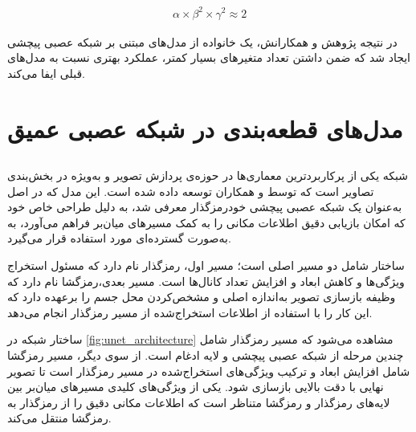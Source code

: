  
\begin{latin}
\begin{equation}
\label{eq:ch2-EffNet}
\begin{aligned}
\alpha \times \beta^2 \times \gamma^2 \approx 2
\end{aligned}
\end{equation}
\end{latin}

 در نتیجه پژوهش 
  و همکارانش، یک خانواده از مدل‌های مبتنی بر شبکه عصبی پیچشی ایجاد شد که ضمن داشتن تعداد متغیرهای بسیار کمتر، عملکرد بهتری نسبت به مدل‌های قبلی ایفا می‌کند.
 

\section{مدل‌های قطعه‌بندی در شبکه عصبی عمیق}

\subsection{}

شبکه
 یکی از پرکاربردترین معماری‌ها در حوزه‌ی پردازش تصویر و به‌ویژه در بخش‌بندی تصاویر است که توسط
 \cite{ronneberger2015u}
 و همکاران توسعه داده ‌شده است. این مدل که در اصل به‌عنوان یک شبکه عصبی پیچشی خودرمزگذار
   معرفی شد، به دلیل طراحی خاص خود که امکان بازیابی دقیق اطلاعات مکانی را به کمک مسیرهای  میان‌بر فراهم می‌آورد، به به‌صورت گسترده‌ای مورد استفاده قرار می‌گیرد.

ساختار  شامل دو مسیر اصلی است؛ 
مسیر اول، رمزگذار نام دارد که مسئول استخراج ویژگی‌ها و کاهش ابعاد و افزایش تعداد کانال‌ها است.
مسیر بعدی،‌رمزگشا نام دارد که وظیفه بازسازی تصویر به‌اندازه اصلی و مشخص‌کردن محل جسم را برعهده دارد که این کار را با استفاده از اطلاعات استخراج‌شده از مسیر رمزگذار انجام می‌دهد.

ساختار شبکه 
در \autoref{fig:unet_architecture} مشاهده می‌شود که مسیر رمزگذار شامل چندین مرحله از شبکه عصبی پیچشی و لایه ادغام
 است. از سوی دیگر، مسیر رمزگشا شامل افزایش ابعاد و ترکیب ویژگی‌های استخراج‌شده در مسیر رمزگذار است تا تصویر نهایی با دقت بالایی بازسازی شود. یکی از ویژگی‌های کلیدی
  مسیرهای  میان‌بر بین لایه‌های رمزگذار و رمزگشا متناظر است که اطلاعات مکانی دقیق را از رمزگذار به رمزگشا منتقل می‌کند.

